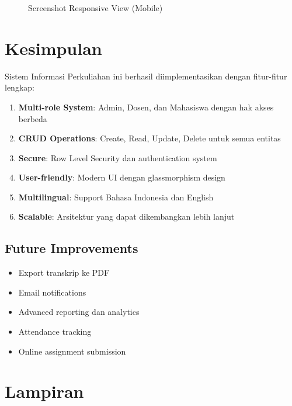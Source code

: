 \documentclass[12pt,a4paper]{article}
\begin{document}
\begin{figure}[H]
\centering
{}
\caption{Screenshot Responsive View (Mobile)}
\end{figure}

\newpage
\section{Kesimpulan}

Sistem Informasi Perkuliahan ini berhasil diimplementasikan dengan fitur-fitur lengkap:

\begin{enumerate}
    \item \textbf{Multi-role System}: Admin, Dosen, dan Mahasiswa dengan hak akses berbeda
    \item \textbf{CRUD Operations}: Create, Read, Update, Delete untuk semua entitas
    \item \textbf{Secure}: Row Level Security dan authentication system
    \item \textbf{User-friendly}: Modern UI dengan glassmorphism design
    \item \textbf{Multilingual}: Support Bahasa Indonesia dan English
    \item \textbf{Scalable}: Arsitektur yang dapat dikembangkan lebih lanjut
\end{enumerate}

\subsection{Future Improvements}

\begin{itemize}
    \item Export transkrip ke PDF
    \item Email notifications
    \item Advanced reporting dan analytics
    \item Attendance tracking
    \item Online assignment submission
\end{itemize}

\newpage
\appendix
\section{Lampiran}
\end{document}
